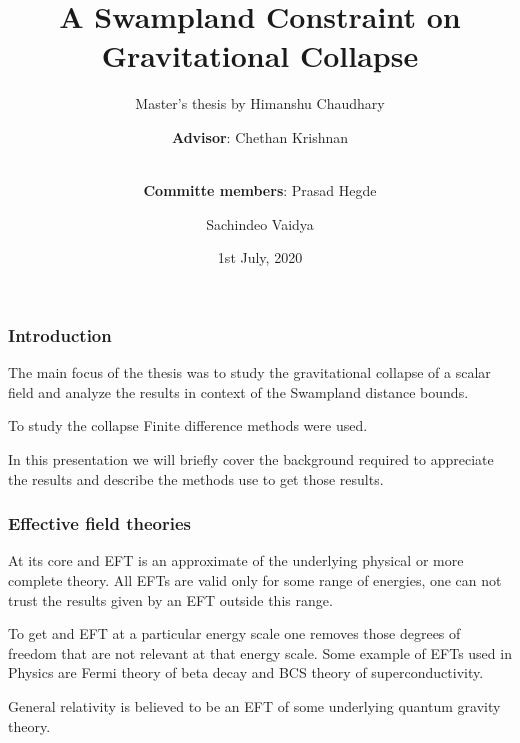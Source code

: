 \documentclass[hyperref={bookmarks=false},aspectratio=169]{beamer}
\title[A Swampland Constraint on Gravitational Collapse]
{\bfseries{A Swampland Constraint on Gravitational Collapse}}
\subtitle{Master's thesis by Himanshu Chaudhary}
\author[Himanshu Chaudhary]
{\textbf{Advisor}: Chethan Krishnan\inst{1}
\and \\
\textbf{Committe members}:
Prasad Hegde\inst{1} \and Sachindeo Vaidya\inst{1}
}
\institute[IISc]
{
  \inst{1}
  Center for High Energy Physics\\
  Indian Institute of Science
}
\date[IISc, 2020]
{1st July, 2020}
\begin{document}
\frame{\titlepage}  %




\begin{frame}
    \frametitle{Introduction}

    The main focus of the thesis was to study the gravitational collapse of a scalar field and analyze the results in context of the Swampland distance bounds.

    To study the collapse Finite difference methods were used.

    In this presentation we will briefly cover the background required to appreciate the results and describe the methods use to get those results.



\end{frame}





\begin{frame}
    \frametitle{Effective field theories}
    At its core and EFT is an approximate of the underlying physical or more complete theory.
    All EFTs are valid only for some range of energies, one can not trust the results given by an EFT outside this range.

    To get and EFT at a particular energy scale one removes those degrees of freedom that are not relevant at that energy scale. Some example of EFTs used in Physics are Fermi theory of beta decay and BCS theory of superconductivity.

    \begin{alertblock}{}
        General relativity is believed to be an EFT of some underlying quantum gravity theory.
    \end{alertblock}

\end{frame}
\end{document}

